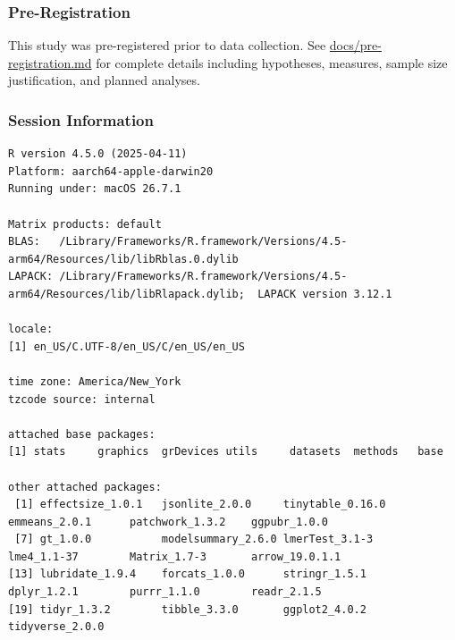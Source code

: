 \documentclass[
  11pt,
  oneside]{article}
\begin{document}
\subsubsection{Pre-Registration}\label{pre-registration}

This study was pre-registered prior to data collection. See
\href{../../docs/pre-registration.md}{docs/pre-registration.md} for
complete details including hypotheses, measures, sample size
justification, and planned analyses.

\subsubsection{Session Information}\label{session-information}

\begin{verbatim}
R version 4.5.0 (2025-04-11)
Platform: aarch64-apple-darwin20
Running under: macOS 26.7.1

Matrix products: default
BLAS:   /Library/Frameworks/R.framework/Versions/4.5-arm64/Resources/lib/libRblas.0.dylib 
LAPACK: /Library/Frameworks/R.framework/Versions/4.5-arm64/Resources/lib/libRlapack.dylib;  LAPACK version 3.12.1

locale:
[1] en_US/C.UTF-8/en_US/C/en_US/en_US

time zone: America/New_York
tzcode source: internal

attached base packages:
[1] stats     graphics  grDevices utils     datasets  methods   base     

other attached packages:
 [1] effectsize_1.0.1   jsonlite_2.0.0     tinytable_0.16.0   emmeans_2.0.1      patchwork_1.3.2    ggpubr_1.0.0      
 [7] gt_1.0.0           modelsummary_2.6.0 lmerTest_3.1-3     lme4_1.1-37        Matrix_1.7-3       arrow_19.0.1.1    
[13] lubridate_1.9.4    forcats_1.0.0      stringr_1.5.1      dplyr_1.2.1        purrr_1.1.0        readr_2.1.5       
[19] tidyr_1.3.2        tibble_3.3.0       ggplot2_4.0.2      tidyverse_2.0.0   


\end{verbatim}
\end{document}
